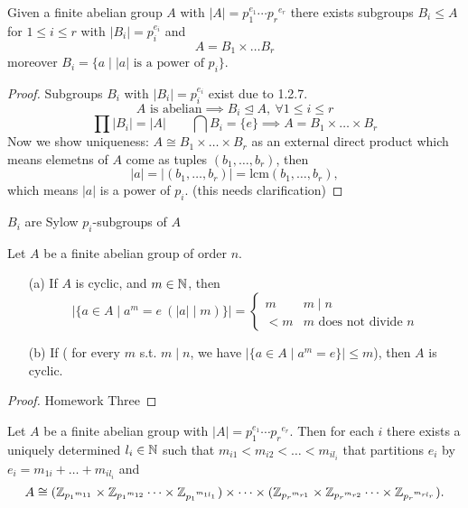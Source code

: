 \documentclass[11pt,leqno,oneside]{amsart}
\newcommand{\normsubgroup}{\mathrel{\unlhd}}
\newcommand{\isom}{\mathrel{\cong}}
\newcommand{\primedecomposition}[3]{#1_1^{#2_1} \cdots {#1_{#3}}^{#2_{#3}}}
\begin{document}
\begin{cor*}[1.2.8]
  Given a finite abelian group \(A\)
  with
  \(|A|=\primedecomposition{p}{e}{r}\)
  there exists subgroups \(B_i \le A\)
  for \(1 \le i \le r\) with
  \(|B_i|=p_i^{e_i}\) and
  \[A = B_1 \times \ldots B_r\] moreover
  \(B_i = \{a \mid |a| \text{ is a power
    of } p_i\}\).
\end{cor*}

\begin{proof}
  Subgroups \(B_i\) with
  \(|B_i|=p_i^{e_i}\) exist due to
  1.2.7.
  \[A \text{ is abelian} \implies B_i
    \normsubgroup A,\ \forall 1 \le i
    \le r\]
  \[\prod|B_i| = |A| \qquad \bigcap B_i
    = \{e\} \implies A = B_1 \times
    \ldots \times B_r\] Now we show
  uniqueness:
  \(A \isom B_1 \times \ldots \times
  B_r\) as an external direct product
  which means elemetns of \(A\) come as
  tuples \((b_1,\ldots,b_r)\), then
  \[|a|=|(b_1,\ldots,b_r)|=\text{lcm}(b_1,\ldots,b_r),\]
  which means \(|a|\) is a power of
  \(p_i\). (this needs clarification)
\end{proof}

\begin{rmk*}
  \(B_i\) are Sylow \(p_i\)-subgroups of
  \(A\)
\end{rmk*}

\begin{prop*}[1.2.9]
  Let \(A\) be a finite abelian group of
  order \(n\).
  \begin{enumerate}
  \item[(a)] If \(A\) is cyclic, and
    \(m \in {\mathbb N}\), then
    \[|\{a \in A \mid a^m = e\ (|a| \mid
      m)\}| =
      \begin{cases}
        m   &  m \mid n\\
        <m & m \text{ does not divide }
        n
      \end{cases}
    \]
  \item[(b)] If ( for every $m$ s.t. \(m \mid n\), we have
    \(|\{a \in A \mid a^m = e\}| \le
    m\)), then \(A\) is cyclic.
  \end{enumerate}
\end{prop*}
\begin{proof}
  Homework Three
\end{proof}

\begin{thm*}
  Let \(A\) be a finite abelian group
  with
  \(|A|=\primedecomposition{p}{e}{r}\). Then
  for each \(i\) there exists a uniquely
  determined \(l_i \in {\mathbb N}\) such that
  \(m_{i1} < m_{i2} < \ldots <
  m_{il_i}\) that partitions \(e_i\) by
  \(e_i=m_{1i}+\ldots+m_{il_i}\) and
  \[A \isom (\Z_{{p_1}^{m_{11}}} \times
    \Z_{{p_1}^{m_{12}}} \cdots \times
    \Z_{{p_1}^{m_{1l_1}}}) \times \cdots
    \times (\Z_{{p_r}^{m_{r1}}} \times
    \Z_{{p_r}^{m_{r2}}} \cdots \times
    \Z_{{p_r}^{m_{rl_r}}}).\]
\end{thm*}
\end{document}
